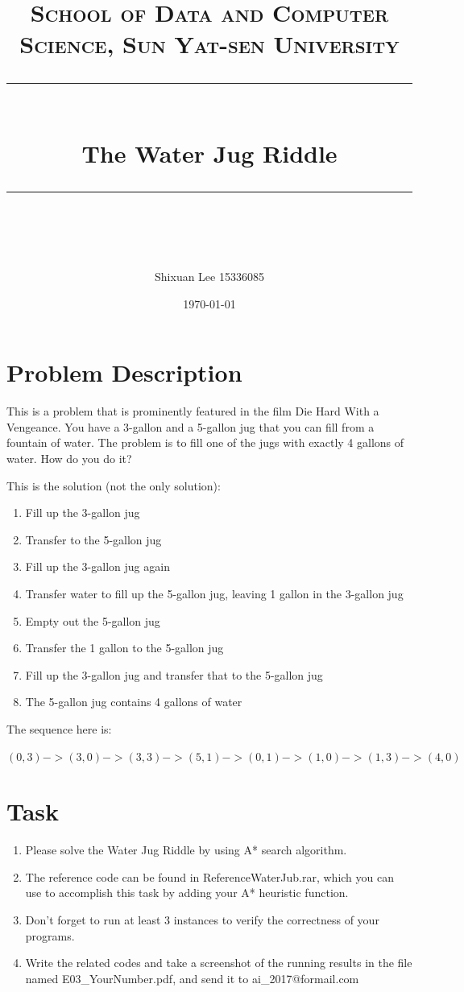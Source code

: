 \documentclass[a4paper, 11pt]{article}
\title{	
\normalfont \normalsize
\textsc{School of Data and Computer Science, Sun Yat-sen University} \\ [25pt] %
\rule{\textwidth}{0.5pt} \\[0.4cm] %
\huge  The Water Jug Riddle\\ %
\rule{\textwidth}{2pt} \\[0.5cm] %
\author{Shixuan Lee 15336085}
\date{\normalsize\today}
}
\begin{document}
\maketitle
\newpage
\tableofcontents
\newpage
\section{Problem Description}
This is a problem that is prominently featured in the film Die Hard With a Vengeance. You have a 3-gallon and a 5-gallon jug that you can fill from a fountain of water. The problem is to fill one of the jugs with exactly 4 gallons of water. How do you do it?

This is the solution (not the only solution):
\begin{enumerate}\setlength{\itemsep}{-\itemsep}
\item Fill up the 3-gallon jug
\item Transfer to the 5-gallon jug
\item Fill up the 3-gallon jug again
\item Transfer water to fill up the 5-gallon jug, leaving 1 gallon in the 3-gallon jug
\item Empty out the 5-gallon jug
\item Transfer the 1 gallon to the 5-gallon jug
\item Fill up the 3-gallon jug and transfer that to the 5-gallon jug
\item The 5-gallon jug contains 4 gallons of water
\end{enumerate}
The sequence here is:

$(0, 3)->(3, 0)->(3, 3)->(5, 1)->(0, 1)->(1, 0)->(1, 3)->(4,0)$

\section{Task}
\begin{enumerate}
\item Please solve the Water Jug Riddle by using A* search algorithm.
\item The reference code can be found in \textsf{ReferenceWaterJub.rar}, which you can use to accomplish this task by adding your A* heuristic function.
\item Don't forget to run at least 3 instances to verify the correctness of your programs.
\item Write the related codes and take a screenshot of the running results in the file named \textsf{E03\_YourNumber.pdf}, and send it to \textsf{ai\_2017@formail.com}
\end{enumerate}
\end{document}
